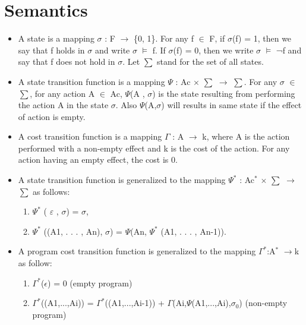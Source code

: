 \documentclass[11pt]{article}
\begin{document}
	\section{Semantics}
	\begin{itemize}
\item 	A state is a mapping $\sigma$ : F $\rightarrow$ \{0, 1\}. For any f $\in$ F, if $\sigma$(f) = 1, then we say that f holds in $\sigma$ and write $\sigma$   $\vDash$   f. If $\sigma$(f) = 0, then we write $\sigma$   $\vDash$   ¬f and say that f does not hold in $\sigma$. Let $\sum$ stand for the set of all states.

\item 	A state transition function is a mapping $\Psi$ : Ac $\times$ $\sum$ $\rightarrow$ $\sum$. For any $\sigma$ $\in$ $\sum$, for any action A $\in$ Ac, $\Psi$(A , $\sigma$) is the state resulting from performing the action A in the state $\sigma$. Also $\Psi$(A,$\sigma$) will results in same state if the effect of action is empty.

\item A cost transition function is a mapping $\Gamma$ : A $\rightarrow$ k, where A is the action performed with a non-empty effect and k is the cost of the action. For any action having an empty effect, the cost is 0.

\item 	A state transition function is generalized to the mapping $\Psi^{\ast}$ : Ac$^{\ast}$  $\times$  $\sum$ $\rightarrow$ $\sum$ as follows: 
\begin{enumerate}

\item $\Psi^{\ast}$ ( $\varepsilon$ , $\sigma$) = $\sigma$,
 
\item $\Psi^{\ast}$ ((A1, . . . , An), $\sigma$) = $\Psi$(An, $\Psi^{\ast}$ (A1, . . . , An-1)). 

\end{enumerate}

\item A program cost transition function is generalized to the mapping $\Gamma^{\ast}$:A$^{\ast}$ $\rightarrow$k as follow:
\begin{enumerate}
\item $\Gamma^{\ast}$($\epsilon$) = 0 (empty program)
\item $\Gamma^{\ast}$((A1,...,Ai)) = $\Gamma^{\ast}$((A1,...,Ai-1)) + $\Gamma$(Ai,$\Psi$(A1,...,Ai),$\sigma_{0}$) (non-empty program)
\end{enumerate}


\end{itemize}
\end{document}
